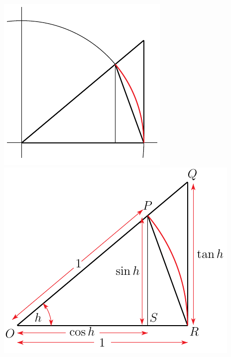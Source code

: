 \begin{efig}
\begin{center}
     \includegraphics{sinDeriv6L}\ \ \
     \includegraphics{sinDeriv6RR}
\end{center}
\end{efig}


